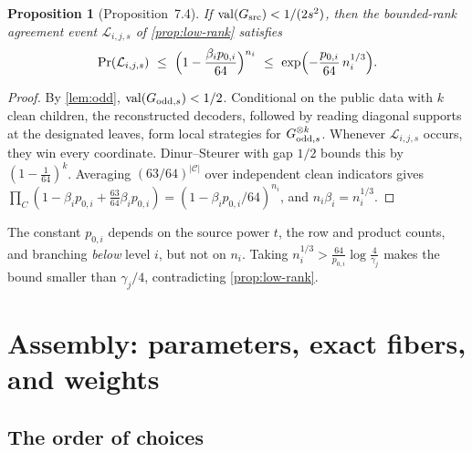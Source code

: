 \documentclass[11pt]{article}
\newtheorem{proposition}[theorem]{Proposition}
\theoremstyle{definition}
\theoremstyle{remark}
\DeclareMathOperator{\val}{val}
\begin{document}
\begin{proposition}[Proposition~7.4]\label{prop:clean}
If $\val(G_{\rm src})<1/(2s^2)$, then the bounded-rank agreement event
$\mathcal L_{i,j,s}$ of \cref{prop:low-rank} satisfies
\[
 \Pr(\mathcal L_{i,j,s})\ \le\ \Bigl(1-\frac{\beta_ip_{0,i}}{64}\Bigr)^{n_i}
 \ \le\ \exp\Bigl(-\frac{p_{0,i}}{64}\,n_i^{1/3}\Bigr).
\]
\end{proposition}

\begin{proof}
By \cref{lem:odd}, $\val(G_{{\rm odd},s})<1/2$. Conditional on the public
data with $k$ clean children, the reconstructed decoders, followed by reading
diagonal supports at the designated leaves, form local strategies for
$G_{{\rm odd},s}^{\otimes k}$. Whenever $\mathcal L_{i,j,s}$ occurs, they win
every coordinate. Dinur--Steurer with gap $1/2$ bounds this by
$(1-\frac1{64})^k$. Averaging $(63/64)^{|\mathcal C|}$ over independent clean
indicators gives
$\prod_C(1-\beta_ip_{0,i}+\frac{63}{64}\beta_ip_{0,i})=(1-\beta_ip_{0,i}/64)^{n_i}$,
and $n_i\beta_i=n_i^{1/3}$.
\end{proof}

The constant $p_{0,i}$ depends on the source power $t$, the row and product
counts, and branching \emph{below} level $i$, but not on $n_i$. Taking
$n_i^{1/3}>\frac{64}{p_{0,i}}\log\frac{4}{\gamma_j}$ makes the bound smaller
than $\gamma_j/4$, contradicting \cref{prop:low-rank}.

\section{Assembly: parameters, exact fibers, and weights}\label{sec:finish}

\subsection{The order of choices}
\end{document}
